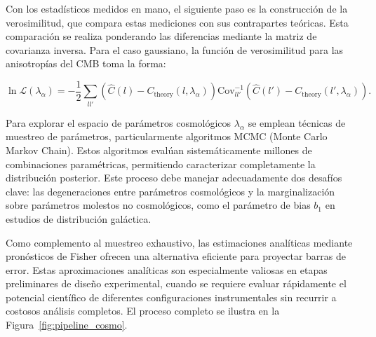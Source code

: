 Con los estadísticos medidos en mano, el siguiente paso es la construcción de la verosimilitud, que compara estas mediciones con sus contrapartes teóricas. Esta comparación se realiza ponderando las diferencias mediante la matriz de covarianza inversa. Para el caso gaussiano, la función de verosimilitud para las anisotropías del CMB toma la forma:

\begin{equation}
\ln \mathcal{L}(\lambda_\alpha) = -\frac{1}{2} \sum_{ll'} \left( \hat{C}(l) - C_{\text{theory}}(l, \lambda_\alpha) \right) \text{Cov}^{-1}_{ll'} \left( \hat{C}(l') - C_{\text{theory}}(l', \lambda_\alpha) \right) .
\end{equation}

Para explorar el espacio de parámetros cosmológicos $\lambda_\alpha$ se emplean técnicas de muestreo de parámetros, particularmente algoritmos MCMC (Monte Carlo Markov Chain). Estos algoritmos evalúan sistemáticamente millones de combinaciones paramétricas, permitiendo caracterizar completamente la distribución posterior. Este proceso debe manejar adecuadamente dos desafíos clave: las degeneraciones entre parámetros cosmológicos y la marginalización sobre parámetros molestos no cosmológicos, como el parámetro de bias $b_1$ en estudios de distribución galáctica.

Como complemento al muestreo exhaustivo, las estimaciones analíticas mediante pronósticos de Fisher ofrecen una alternativa eficiente para proyectar barras de error. Estas aproximaciones analíticas son especialmente valiosas en etapas preliminares de diseño experimental, cuando se requiere evaluar rápidamente el potencial científico de diferentes configuraciones instrumentales sin recurrir a costosos análisis completos. El proceso completo se ilustra en la Figura~\ref{fig:pipeline_cosmo}.



